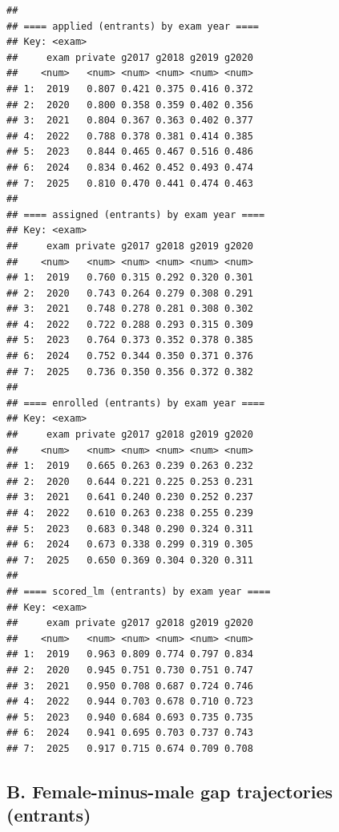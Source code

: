 \documentclass[
]{article}
\begin{document}
\begin{verbatim}
## 
## ==== applied (entrants) by exam year ====
## Key: <exam>
##     exam private g2017 g2018 g2019 g2020
##    <num>   <num> <num> <num> <num> <num>
## 1:  2019   0.807 0.421 0.375 0.416 0.372
## 2:  2020   0.800 0.358 0.359 0.402 0.356
## 3:  2021   0.804 0.367 0.363 0.402 0.377
## 4:  2022   0.788 0.378 0.381 0.414 0.385
## 5:  2023   0.844 0.465 0.467 0.516 0.486
## 6:  2024   0.834 0.462 0.452 0.493 0.474
## 7:  2025   0.810 0.470 0.441 0.474 0.463
## 
## ==== assigned (entrants) by exam year ====
## Key: <exam>
##     exam private g2017 g2018 g2019 g2020
##    <num>   <num> <num> <num> <num> <num>
## 1:  2019   0.760 0.315 0.292 0.320 0.301
## 2:  2020   0.743 0.264 0.279 0.308 0.291
## 3:  2021   0.748 0.278 0.281 0.308 0.302
## 4:  2022   0.722 0.288 0.293 0.315 0.309
## 5:  2023   0.764 0.373 0.352 0.378 0.385
## 6:  2024   0.752 0.344 0.350 0.371 0.376
## 7:  2025   0.736 0.350 0.356 0.372 0.382
## 
## ==== enrolled (entrants) by exam year ====
## Key: <exam>
##     exam private g2017 g2018 g2019 g2020
##    <num>   <num> <num> <num> <num> <num>
## 1:  2019   0.665 0.263 0.239 0.263 0.232
## 2:  2020   0.644 0.221 0.225 0.253 0.231
## 3:  2021   0.641 0.240 0.230 0.252 0.237
## 4:  2022   0.610 0.263 0.238 0.255 0.239
## 5:  2023   0.683 0.348 0.290 0.324 0.311
## 6:  2024   0.673 0.338 0.299 0.319 0.305
## 7:  2025   0.650 0.369 0.304 0.320 0.311
## 
## ==== scored_lm (entrants) by exam year ====
## Key: <exam>
##     exam private g2017 g2018 g2019 g2020
##    <num>   <num> <num> <num> <num> <num>
## 1:  2019   0.963 0.809 0.774 0.797 0.834
## 2:  2020   0.945 0.751 0.730 0.751 0.747
## 3:  2021   0.950 0.708 0.687 0.724 0.746
## 4:  2022   0.944 0.703 0.678 0.710 0.723
## 5:  2023   0.940 0.684 0.693 0.735 0.735
## 6:  2024   0.941 0.695 0.703 0.737 0.743
## 7:  2025   0.917 0.715 0.674 0.709 0.708
\end{verbatim}

\hypertarget{b.-female-minus-male-gap-trajectories-entrants}{%
\subsection{B. Female-minus-male gap trajectories
(entrants)}\label{b.-female-minus-male-gap-trajectories-entrants}}
\end{document}
